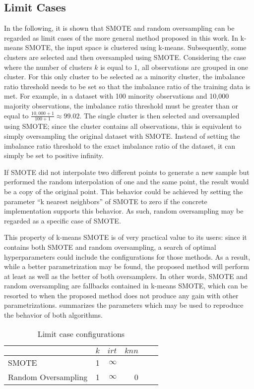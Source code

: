 \documentclass[sort&compress]{elsarticle}
\begin{document}
	\subsection{Limit Cases}
	In the following, it is shown that \ac{SMOTE} and random oversampling can be
	regarded as limit cases of the more general method proposed in this work. In
	k-means \ac{SMOTE}, the input space is clustered using k-means.
	Subsequently, some clusters are selected and then oversampled using
	\ac{SMOTE}. Considering the case where the number of clusters $k$ is equal
	to 1, all observations are grouped in one cluster. For this only cluster to
	be selected as a minority cluster, the imbalance ratio threshold needs to be
	set so that the imbalance ratio of the training data is met. For example, in
	a dataset with 100 minority observations and 10,000 majority observations,
	the imbalance ratio threshold must be greater than or equal to $\frac{10,000
	+ 1}{100 + 1} \approx 99.02$. The single cluster is then selected and
	oversampled using \ac{SMOTE}; since the cluster contains all observations,
	this is equivalent to simply oversampling the original dataset with
	\ac{SMOTE}. Instead of setting the imbalance ratio threshold to the exact
	imbalance ratio of the dataset, it can simply be set to positive infinity.

	If \ac{SMOTE} did not interpolate two different points to generate a new
	sample but performed the random interpolation of one and the same point, the
	result would be a copy of the original point. This behavior could be
	achieved by setting the parameter ``k nearest neighbors'' of \ac{SMOTE} to
	zero if the concrete implementation supports this behavior. As such, random
	oversampling may be regarded as a specific case of \ac{SMOTE}.

	This property of k-means \ac{SMOTE} is of very practical value to its users:
	since it contains both \ac{SMOTE} and random oversampling, a search of
	optimal hyperparameters could include the configurations for those methods.
	As a result, while a better parametrization may be found, the proposed
	method will perform at least as well as the better of both oversamplers. In
	other words, \ac{SMOTE} and random oversampling are fallbacks contained in
	k-means \ac{SMOTE}, which can be resorted to when the proposed method does
	not produce any gain with other parametrizations. 
	summarizes the parameters which may be used to reproduce the behavior of
	both algorithms.
	\begin{table}[!htb]
		\centering
		\begin{tabular}{lrrrrr}
		\toprule
							& $k$ & $irt$    & $knn$ \\
		\midrule
		\ac{SMOTE}          & 1 & $\infty$ &     \\
		Random Oversampling & 1 & $\infty$ & 0  \\
		\bottomrule
		\end{tabular}
		\caption{Limit case configurations}
		\label{tab:limit-case}
	\end{table}
\end{document}
